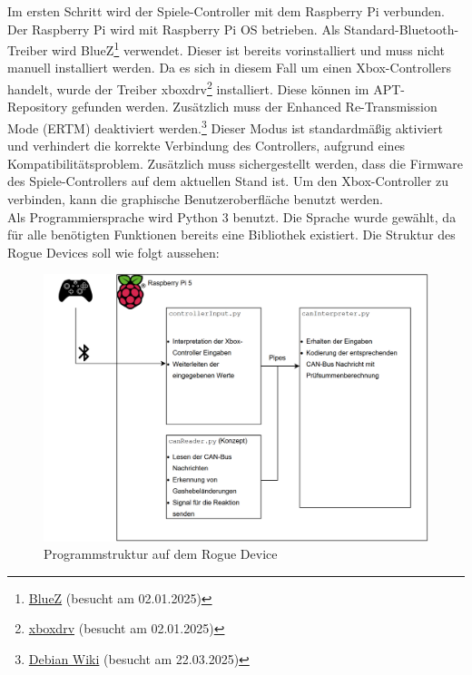 Im ersten Schritt wird der Spiele-Controller mit dem Raspberry Pi verbunden. Der Raspberry Pi wird mit Raspberry Pi OS betrieben.
Als Standard-Bluetooth-Treiber wird BlueZ\footnote{\href{https://www.bluez.org/}{BlueZ} (besucht am 02.01.2025)} verwendet. 
Dieser ist bereits vorinstalliert und muss 
nicht manuell installiert werden. Da es sich in diesem Fall um einen Xbox-Controllers handelt, wurde der Treiber
xboxdrv\footnote{\href{https://github.com/xboxdrv/xboxdrv}{xboxdrv} (besucht am 02.01.2025)} installiert. 
Diese können im APT-Repository gefunden werden.
Zusätzlich muss der Enhanced Re-Transmission Mode (ERTM) deaktiviert 
werden.\footnote{\href{https://wiki.debian.org/Gamepad\#Xbox\_Controllers\_over\_Bluetooth}{Debian Wiki} (besucht am 22.03.2025)} 
Dieser Modus ist standardmäßig aktiviert und
verhindert die korrekte Verbindung des Controllers, aufgrund eines Kompatibilitätsproblem.
Zusätzlich muss sichergestellt werden, dass die Firmware des Spiele-Controllers
auf dem aktuellen Stand ist. Um den Xbox-Controller zu verbinden, kann die graphische Benutzeroberfläche benutzt werden.
\\
Als Programmiersprache wird Python 3 benutzt. Die Sprache wurde gewählt, da für alle benötigten Funktionen bereits eine Bibliothek
existiert.
Die Struktur des Rogue Devices soll wie folgt aussehen:
\begin{figure}[H]
    \centering
    \includegraphics[scale=0.4]{images/piKonzept.png}
    \caption{Programmstruktur auf dem Rogue Device}
    \label{fig:structureRogueDevice}
\end{figure}

